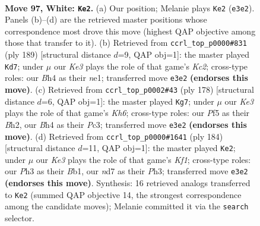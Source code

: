 \documentclass[11pt]{article}
\begin{document}
\clearpage

\begin{figure}[p]\centering
\begin{subfigure}{0.46\textwidth}\centering
\resizebox{\linewidth}{!}{%
\newchessgame
\chessboard[
  setfen={7k/3n4/8/5P2/p6B/P3K2P/8/8 w - - 13 97},
  showmover=false,
  pgfstyle=straightmove, color=movearrow, markmove={e3-e2}
]}
\caption{}
\end{subfigure}\hfill
\begin{subfigure}{0.46\textwidth}\centering
\resizebox{\linewidth}{!}{%
\newchessgame
\chessboard[
  setfen={8/2k5/8/p7/P7/2K5/4p3/4N3 b - - 57 95},
  showmover=false,
  pgfstyle=straightmove, color=movearrow, markmove={c7-d7}
]}
\caption{}
\end{subfigure}
\\[4pt]
\begin{subfigure}{0.46\textwidth}\centering
\resizebox{\linewidth}{!}{%
\newchessgame
\chessboard[
  setfen={8/1b6/1P2k2K/8/2p5/2P5/2P4B/8 w - - 17 90},
  showmover=false,
  pgfstyle=straightmove, color=movearrow, markmove={h6-g7}
]}
\caption{}
\end{subfigure}\hfill
\begin{subfigure}{0.46\textwidth}\centering
\resizebox{\linewidth}{!}{%
\newchessgame
\chessboard[
  setfen={8/8/5k2/b5p1/8/5PPP/8/1B3K2 w - - 3 93},
  showmover=false,
  pgfstyle=straightmove, color=movearrow, markmove={f1-e2}
]}
\caption{}
\end{subfigure}
\caption{\textbf{Move 97, White: \texttt{Ke2}.} (a) Our position; Melanie plays \texttt{Ke2} (\texttt{e3e2}). Panels (b)--(d) are the retrieved master positions whose correspondence most drove this move (highest QAP objective among those that transfer to it). (b) Retrieved from \texttt{ccrl\_top\_p0000\#831} (ply 189) [structural distance $d$=9, QAP obj=1]: the master played \texttt{Kd7}; under $\mu$ our \emph{Ke3} plays the role of that game's \emph{Kc2}; cross-type roles: our \emph{B}h4 as their \emph{n}e1; transferred move \texttt{e3e2} \textbf{(endorses this move)}. (c) Retrieved from \texttt{ccrl\_top\_p0002\#43} (ply 178) [structural distance $d$=6, QAP obj=1]: the master played \texttt{Kg7}; under $\mu$ our \emph{Ke3} plays the role of that game's \emph{Kh6}; cross-type roles: our \emph{P}f5 as their \emph{B}h2, our \emph{B}h4 as their \emph{P}c3; transferred move \texttt{e3e2} \textbf{(endorses this move)}. (d) Retrieved from \texttt{ccrl\_top\_p0000\#1641} (ply 184) [structural distance $d$=11, QAP obj=1]: the master played \texttt{Ke2}; under $\mu$ our \emph{Ke3} plays the role of that game's \emph{Kf1}; cross-type roles: our \emph{P}h3 as their \emph{B}b1, our \emph{n}d7 as their \emph{P}h3; transferred move \texttt{e3e2} \textbf{(endorses this move)}. Synthesis: 16 retrieved analogs transferred to \texttt{Ke2} (summed QAP objective 14, the strongest correspondence among the candidate moves); Melanie committed it via the \texttt{search} selector.}
\label{fig:thought-m192}
\end{figure}
\end{document}
